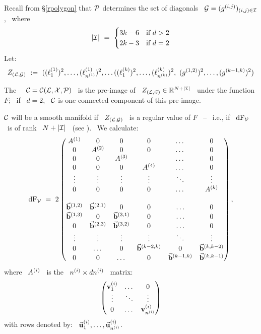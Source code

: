 Recall from \S \ref{rpolygon} that $\mathcal{P}$ determines the set of
diagonals \ $\mathcal{G}=(g\sp{({i,j})})_{(i,j)\in\mathcal{I}}$, \ where \
$$
|\mathcal{I}|~=~\begin{cases} 3k-6 & \text{if~}d>2\\
2k-3 & \text{if~}d=2
\end{cases}
$$
%
Let:
%
\begin{equation*}
%
Z_{(\Lc,\Gc)}~:=~((\lj{1}_{1})^{2},\dotsc,(\lj{1}_{\nj{1}})^{2},\dotsc
((\lj{k}_{1})^{2},\dotsc,(\lj{k}_{\nj{k}})^{2},\
(\gj{1,2})^{2},\dotsc,(\gj{k-1,k})^{2})
%
\end{equation*}

The \cspace\ \ $\mathcal{C}=\mathcal{C}(\mathcal{L},\mathcal{X},\mathcal{P})$ \ is the pre-image
of \ $Z_{(\mathcal{L},\mathcal{G})}\in {\mathbb R}^{N+|\mathcal{I}|}$ \ under the function $F$; \
if \ $d=2$, \ $\mathcal{C}$ is one connected component of this pre-image\vsm.

$\mathcal{C}$ will be a smooth manifold if \ $Z_{(\mathcal{L},\mathcal{G})}$ \ is a regular
value of $F$ \ -- \ i.e., if  \ $\operatorname{dF}_{\mathcal{V}}$ \ is of rank \ $N+|\mathcal{I}|$ \
(see \cite[I, Theorem 3.2]{Hi}). \ We calculate:
%
\begin{equation}\label{edf}
%
\dF_{\Vc}~=~2
\begin{pmatrix}
%
A\up{1}    & 0         &  0           &  0          & \dotsc  & 0  \\
 0         &A\up{2}    &  0           &  0          & \dotsc  & 0  \\
 0         & 0         & A\up{3}      &             & \dotsc  & 0  \\
 0         & 0         &  0           & A\up{4}     & \dotsc  & 0  \\
 \vdots    & \vdots    &  \vdots      & \vdots      & \ddots  & \vdots \\
 0         & 0         &  0           & 0           & \dotsc  & A\up{k} \\
& & & & & \\
\bj{1}{2}  & \bj{2}{1} & 0            & 0 &  \ldots     & 0          \\
\bj{1}{3}  & 0         & \bj{3}{1}    & 0 &  \ldots     & 0          \\
 0         &\bj{2}{3}  & \bj{3}{2}    & 0 &  \ldots     & 0          \\
\vdots     & \vdots    &  \vdots      &  \vdots     & \ddots  & \vdots \\
 0         & \dotsc    & 0 & \bj{k-2}{k}  & 0           & \bj{k}{k-2}\\
 0         & 0    & \dotsc & 0             & \bj{k-1}{k} & \bj{k}{k-1}
\end{pmatrix}\vspace{4mm},
%
\end{equation}
%
where \ $A\sp{({i})}$ \ is the  \ $n\sp{({i})}\times dn\sp{({i})}$ \ matrix:
%
\begin{equation}\label{eai}
\begin{pmatrix}
%
\vj{i}_{1} & \dotsc & 0     \\
\vdots     & \ddots & \vdots \\
0          & \dotsc & \vj{i}_{\nj{i}}
\end{pmatrix}
%
\end{equation}
%
\noindent with rows denoted by: \ $\vec{\mathbf u}\sp{({i})}\sb{1},\dotsc,\vec{\mathbf u}\sp{({i})}\sb{n\sp{({i})}}$.

